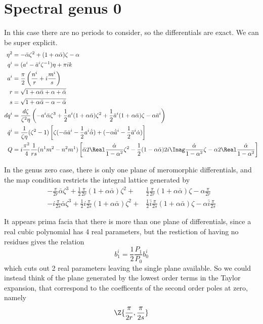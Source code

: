 \documentclass{article}
\begin{document}
\chapter{Spectral genus 0} %
\label{chp:spectral_genus_0}
In this case there are no periods to consider, so the differentials are exact. We can be super explicit.
\begin{align*}
\eta^2 &= -\bar\alpha \zeta^2 + (1+\alpha\bar\alpha)\zeta - \alpha \\
q^i &= (a^i - \bar a^i \zeta^{-1})\eta + \pi i k \\
a^i &= \frac{\pi}{2}\left( \frac{n^i}{r} + i \frac{m^i}{s} \right) \\
r &= \sqrt{1 + \alpha\bar\alpha + \alpha + \bar\alpha} \\
s &= \sqrt{1 + \alpha\bar\alpha - \alpha - \bar\alpha} \\
dq^i &= \frac{d\zeta}{\zeta^2\eta} \left( -a^i\bar\alpha\zeta^3 + \frac{1}{2}a^i(1+\alpha\bar\alpha)\zeta^2 + \frac{1}{2}\bar a^i(1+\alpha\bar\alpha)\zeta  - \alpha\bar a^i\right) \\
\dot q^i &= \frac{1}{\zeta\eta}(\zeta^2-1)\left[ \zeta(-\bar\alpha\dot a^i - \frac{1}{2} a^i \dot{\bar\alpha}) + (-\alpha\dot {\bar a}^i - \frac{1}{2} \bar a^i \dot\alpha) \right]\\
Q &= i \frac{\pi^2}{4}\frac{1}{rs}(n^1m^2-n^2m^1) \left[ \bar\alpha 2\Real\frac{\dot\alpha}{1-\alpha^2}\zeta^2 - \frac{1}{2}(1-\alpha\bar\alpha)2i\Imag\frac{\dot\alpha}{1-\alpha^2} \zeta - \alpha 2\Real\frac{\dot\alpha}{1-\alpha^2}\right]
\end{align*}

In the genus zero case, there is only one plane of meromorphic differentials, and the map condition restricts the integral lattice generated by
\begin{align*}
-\frac{\pi}{2r}\bar\alpha\zeta^3 + \frac{1}{2}\frac{\pi}{2r}(1+\alpha\bar\alpha)\zeta^2 +& \frac{1}{2}\frac{\pi}{2r}(1+\alpha\bar\alpha)\zeta  - \alpha\frac{\pi}{2r} \\
-i\frac{\pi}{2s}\bar\alpha\zeta^3 + \frac{1}{2}i\frac{\pi}{2s}(1+\alpha\bar\alpha)\zeta^2 +& \frac{1}{2}\bar i\frac{\pi}{2s}(1+\alpha\bar\alpha)\zeta  - \alpha\bar i\frac{\pi}{2s}
\end{align*}

It appears prima facia that there is more than one plane of differentials, since a real cubic polynomial has 4 real parameters, but the restiction of having no residues gives the relation
\[
b^i_1 = \frac{1}{2}\frac{P_1}{P_0}b^i_0
\]
which cuts out 2 real parameters leaving the single plane available. So we could instead think of the plane generated by the lowest order terms in the Taylor expansion, that correspond to the coefficents of the second order poles at zero, namely
\[
\Z\{\frac{\pi}{2r}, \frac{\pi}{2s}\}
\]
\end{document}
